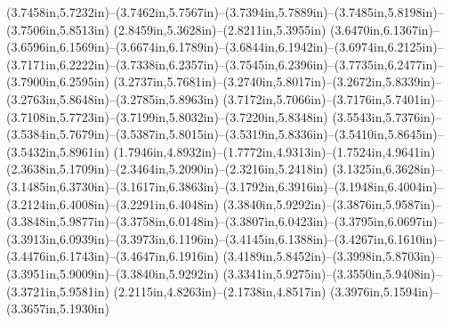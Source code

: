 (3.7458in,5.7232in)--(3.7462in,5.7567in)--(3.7394in,5.7889in)--(3.7485in,5.8198in)--(3.7506in,5.8513in) (2.8459in,5.3628in)--(2.8211in,5.3955in) (3.6470in,6.1367in)--(3.6596in,6.1569in)--(3.6674in,6.1789in)--(3.6844in,6.1942in)--(3.6974in,6.2125in)--(3.7171in,6.2222in)--(3.7338in,6.2357in)--(3.7545in,6.2396in)--(3.7735in,6.2477in)--(3.7900in,6.2595in) (3.2737in,5.7681in)--(3.2740in,5.8017in)--(3.2672in,5.8339in)--(3.2763in,5.8648in)--(3.2785in,5.8963in) (3.7172in,5.7066in)--(3.7176in,5.7401in)--(3.7108in,5.7723in)--(3.7199in,5.8032in)--(3.7220in,5.8348in) (3.5543in,5.7376in)--(3.5384in,5.7679in)--(3.5387in,5.8015in)--(3.5319in,5.8336in)--(3.5410in,5.8645in)--(3.5432in,5.8961in) (1.7946in,4.8932in)--(1.7772in,4.9313in)--(1.7524in,4.9641in) (2.3638in,5.1709in)--(2.3464in,5.2090in)--(2.3216in,5.2418in) (3.1325in,6.3628in)--(3.1485in,6.3730in)--(3.1617in,6.3863in)--(3.1792in,6.3916in)--(3.1948in,6.4004in)--(3.2124in,6.4008in)--(3.2291in,6.4048in) (3.3840in,5.9292in)--(3.3876in,5.9587in)--(3.3848in,5.9877in)--(3.3758in,6.0148in)--(3.3807in,6.0423in)--(3.3795in,6.0697in)--(3.3913in,6.0939in)--(3.3973in,6.1196in)--(3.4145in,6.1388in)--(3.4267in,6.1610in)--(3.4476in,6.1743in)--(3.4647in,6.1916in) (3.4189in,5.8452in)--(3.3998in,5.8703in)--(3.3951in,5.9009in)--(3.3840in,5.9292in) (3.3341in,5.9275in)--(3.3550in,5.9408in)--(3.3721in,5.9581in) (2.2115in,4.8263in)--(2.1738in,4.8517in) (3.3976in,5.1594in)--(3.3657in,5.1930in)
